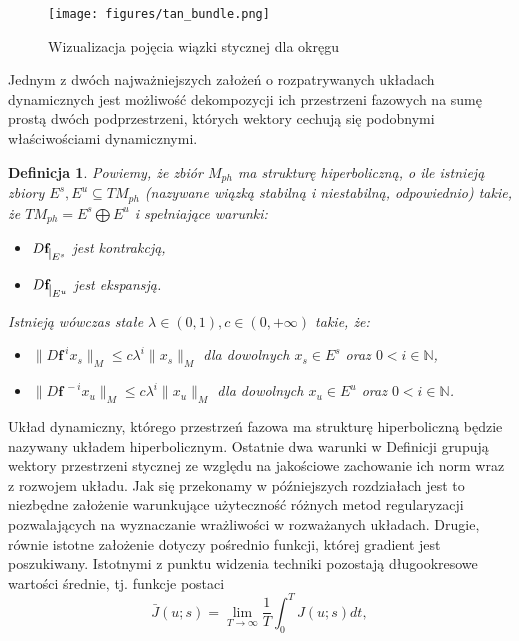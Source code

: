 \documentclass[12pt]{article}
\newtheorem{defi}{Definicja}
\begin{document}
\begin{figure}[H]
	\texttt{[image: figures/tan\_bundle.png]} 
	\centering
	\caption{Wizualizacja pojęcia wiązki stycznej dla okręgu}
\end{figure}
Jednym z dwóch najważniejszych założeń o rozpatrywanych układach dynamicznych jest możliwość dekompozycji ich przestrzeni fazowych na sumę prostą dwóch podprzestrzeni, których wektory cechują się podobnymi właściwościami dynamicznymi.
\begin{defi}\label{hyperbolic_set}
	Powiemy, że zbiór $M_{ph}$ ma strukturę hiperboliczną, o ile istnieją zbiory $ E^{s},E^{u} \subseteq TM_{ph}$ (nazywane wiązką stabilną i niestabilną, odpowiednio) takie, że $ TM_{ph} = E^{s} \bigoplus E^{u}$ i spełniające warunki:
	\begin{itemize}
		\item $ D\textbf{f}_{\mkern 1mu \vrule height 2ex\mkern2mu E^{s}} $ jest kontrakcją,
		\item $ D\textbf{f}_{\mkern 1mu \vrule height 2ex\mkern2mu E^{u}} $ jest ekspansją.
	\end{itemize}
	Istnieją wówczas stałe $ \lambda \in (0,1), c \in (0,+\infty) $ takie, że:
	\begin{itemize}
		\item $ \| D\textbf{f}^{\ i}x_{s}\|_{M} \leq c\lambda^{i} \| x_{s}\|_{M}$ dla dowolnych $ x_{s} \in E^{s} $ oraz $ 0 < i \in \mathbb{N} $,
		\item $ \| D\textbf{f}^{\ -i}x_{u}\|_{M} \leq c\lambda^{i} \| x_{u}\|_{M}$ dla dowolnych $ x_{u} \in E^{u} $ oraz $ 0 < i \in \mathbb{N} $.
	\end{itemize}
\end{defi}
Układ dynamiczny, którego przestrzeń fazowa ma strukturę hiperboliczną będzie nazywany układem hiperbolicznym. Ostatnie dwa warunki w Definicji grupują wektory przestrzeni stycznej ze względu na jakościowe zachowanie ich norm wraz z rozwojem układu. Jak się przekonamy w późniejszych rozdziałach jest to niezbędne założenie warunkujące użyteczność różnych metod regularyzacji pozwalających na wyznaczanie wrażliwości w rozważanych układach. \newline
Drugie, równie istotne założenie dotyczy pośrednio funkcji, której gradient jest poszukiwany. Istotnymi z punktu widzenia techniki pozostają długookresowe wartości średnie, tj. funkcje postaci
\begin{equation}
\bar{J}(u;s) = \lim\limits_{T \rightarrow \infty}\frac{1}{T}\int_{0}^{T}J(u;s)dt,
\label{J_bar}
\end{equation}
\end{document}
